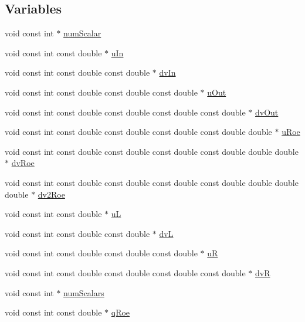\subsection*{Variables}
\begin{DoxyCompactItemize}
\item 
void const int $\ast$ \hyperlink{RoeKernels_8H_a69440a5a13a588383e4cf4872dcba0ec}{num\+Scalar}
\item 
void const int const double $\ast$ \hyperlink{RoeKernels_8H_a1b97e89ad96c3195da39163d30857767}{u\+In}
\item 
void const int const double const double $\ast$ \hyperlink{RoeKernels_8H_a24a50bb7f3155b1d6314eec79d33d669}{dv\+In}
\item 
void const int const double const double const double $\ast$ \hyperlink{RoeKernels_8H_aa8ba2167c968e6f2da632acd106b7f88}{u\+Out}
\item 
void const int const double const double const double const double $\ast$ \hyperlink{RoeKernels_8H_ac5fd034bc232848163b16d30e790e8b1}{dv\+Out}
\item 
void const int const double const double const double const double double $\ast$ \hyperlink{RoeKernels_8H_a5624e61551b02c502a36c52d56b2350b}{u\+Roe}
\item 
void const int const double const double const double const double double double $\ast$ \hyperlink{RoeKernels_8H_a642571b2454da1bb84221249e107f82a}{dv\+Roe}
\item 
void const int const double const double const double const double double double double $\ast$ \hyperlink{RoeKernels_8H_a21369091011c3e247805004394055b28}{dv2\+Roe}
\item 
void const int const double $\ast$ \hyperlink{RoeKernels_8H_a9dfc587f7fe16adaf8968f62e62ea6a7}{uL}
\item 
void const int const double const double $\ast$ \hyperlink{RoeKernels_8H_a6be6b080530ea7105efc943756d2d87e}{dvL}
\item 
void const int const double const double const double $\ast$ \hyperlink{RoeKernels_8H_a1ea2314c87ebfdd0ac10106c76b3bd08}{uR}
\item 
void const int const double const double const double const double $\ast$ \hyperlink{RoeKernels_8H_a707f1194fbf12a091390be0a7f5b60b1}{dvR}
\item 
void const int $\ast$ \hyperlink{RoeKernels_8H_adfdaef4223583c4c0fc2fd3930f44a71}{num\+Scalars}
\item 
void const int const double $\ast$ \hyperlink{RoeKernels_8H_a1d673d40f8fa40c8e56ed0d69021e9dc}{q\+Roe}

\end{DoxyCompactItemize}
